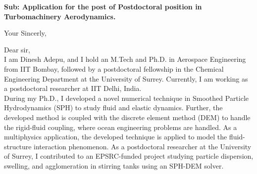 \documentclass[11pt,a4paper,roman]{moderncv}
\begin{document}
\date{\today}
\opening{\textbf{Sub: Application for the post of Postdoctoral position in Turbomachinery Aerodynamics.}}
\closing{Your Sincerly, \vspace{-1em}}


\makelettertitle



Dear sir,
\\
\vspace{1em}
I am Dinesh Adepu, and I hold an M.Tech and Ph.D. in Aerospace
Engineering from IIT Bombay, followed by a postdoctoral fellowship in
the Chemical Engineering Department at the University of
Surrey. Currently, I am working as a postdoctoral researcher at IIT
Delhi, India. \\


\vspace{1em}
During my Ph.D., I developed a novel numerical technique in Smoothed
Particle Hydrodynamics (SPH) to study fluid and elastic dynamics.
Further, the developed method is coupled with the discrete element
method (DEM) to handle the rigid-fluid coupling, where ocean
engineering problems are handled. As a multiphysics application, the
developed technique is applied to model the fluid-structure
interaction phenomenon.  As a postdoctoral researcher at the
University of Surrey, I contributed to an EPSRC-funded project
studying particle dispersion, swelling, and agglomeration in stirring
tanks using an SPH-DEM solver.\\
\end{document}
